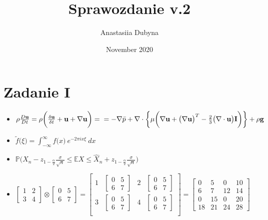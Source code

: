 \documentclass[12pt]{article}
\title{\vspace{-2.0 cm}Sprawozdanie v.2}
\author{Anastasiia Dubyna }
\date{November 2020}
\begin{document}
\maketitle

\section* {Zadanie I}
\begin{itemize}
    \large\item $\rho \frac{D \mathbf{u}}{Dt} = \rho\bigg(\frac{\delta \mathbf{u}}{\delta t} + \mathbf{u} + \nabla \mathbf{u}\bigg) = \\ = -\nabla \bar{p} + \nabla \cdot \bigg\{\mu \bigg(\nabla\mathbf{u} + \big(\nabla\mathbf{u} \big)^T - \frac{2}{3} \big(\nabla \cdot \mathbf{u} \big) \mathbf{I} \bigg)\bigg\} + \rho\mathbf{g} $
    \large\item $\tilde{f} \big(\xi\big) = \int^\infty_{-\infty} f\big(x\big) \: e^{-2\pi i x \xi} \: dx $
    \large\item $\mathbb{P}\bigg( \hat{X}_n - z_{1-\frac{\alpha}{2}} \frac{\sigma}{\sqrt{n}} \leqslant \mathbb{E}X \leqslant \hat{X}_n + z_{1-\frac{\alpha}{2}} \frac{\sigma}{\sqrt{n}} \bigg)$
    \large\item $ 
    \begin{bmatrix}
    1 & 2 \\
    3 & 4
    \end{bmatrix}
    \otimes
    \begin{bmatrix}
    0 & 5 \\
    6 & 7
    \end{bmatrix}
    =
    \begin{bmatrix}
    1 &
    \begin{bmatrix}
    0 & 5 \\
    6 & 7
    \end{bmatrix}
    & 2 &
    \begin{bmatrix}
    0 & 5 \\
    6 & 7
    \end{bmatrix} \\
    3 &
    \begin{bmatrix}
    0 & 5 \\
    6 & 7
    \end{bmatrix}
    & 4 &
    \begin{bmatrix}
    0 & 5 \\
    6 & 7
    \end{bmatrix} \\
    \end{bmatrix}
    =
    \begin{bmatrix}
    0 & 5 & 0 & 10 \\
    6 & 7 & 12 & 14 \\
    0 & 15 & 0 & 20 \\
    18 & 21 & 24 & 28
    \end{bmatrix}
    $
\end{itemize}
\newpage
\end{document}
